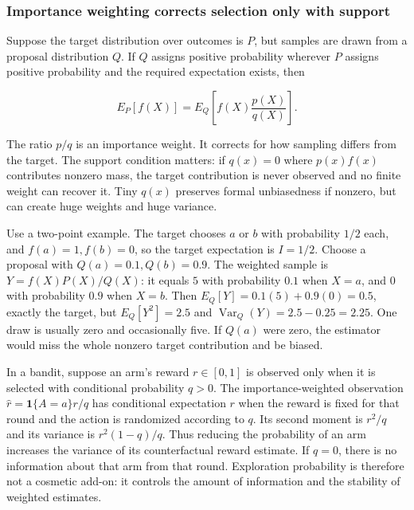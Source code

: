 \subsubsection{Importance weighting corrects selection only with support}\label{02-foundations-ii-ch029-importance-weighting-corrects-selection-only-with-support}

\hypertarget{02-foundations-ii-ch029-importance-weighting-corrects-selection-only-with-support}{}

Suppose the target distribution over outcomes is \(P\), but samples are drawn from a proposal distribution \(Q\). If \(Q\) assigns positive probability wherever \(P\) assigns positive probability and the required expectation exists, then

\[
E_P[f(X)]=E_Q\left[f(X)\frac{p(X)}{q(X)}\right].
\]

The ratio \(p/q\) is an importance weight. It corrects for how sampling differs from the target. The support condition matters: if \(q(x)=0\) where \(p(x)f(x)\) contributes nonzero mass, the target contribution is never observed and no finite weight can recover it. Tiny \(q(x)\) preserves formal unbiasedness if nonzero, but can create huge weights and huge variance.

Use a two-point example. The target chooses \(a\) or \(b\) with probability \(1/2\) each, and \(f(a)=1,f(b)=0\), so the target expectation is \(I=1/2\). Choose a proposal with \(Q(a)=0.1,Q(b)=0.9\). The weighted sample is \(Y=f(X)P(X)/Q(X)\): it equals \(5\) with probability \(0.1\) when \(X=a\), and \(0\) with probability \(0.9\) when \(X=b\). Then \(E_Q[Y]=0.1(5)+0.9(0)=0.5\), exactly the target, but \(E_Q[Y^2]=2.5\) and \(\operatorname{Var}_Q(Y)=2.5-0.25=2.25\). One draw is usually zero and occasionally five. If \(Q(a)\) were zero, the estimator would miss the whole nonzero target contribution and be biased.

In a bandit, suppose an arm's reward \(r\in[0,1]\) is observed only when it is selected with conditional probability \(q>0\). The importance-weighted observation \(\hat r=\mathbf 1\{A=a\}r/q\) has conditional expectation \(r\) when the reward is fixed for that round and the action is randomized according to \(q\). Its second moment is \(r^2/q\) and its variance is \(r^2(1-q)/q\). Thus reducing the probability of an arm increases the variance of its counterfactual reward estimate. If \(q=0\), there is no information about that arm from that round. Exploration probability is therefore not a cosmetic add-on: it controls the amount of information and the stability of weighted estimates.

